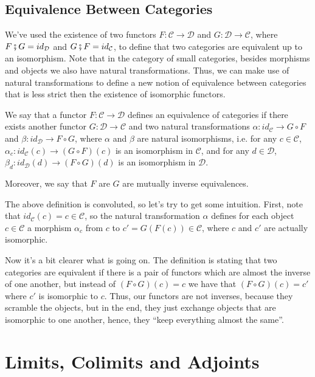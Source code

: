 \subsection{Equivalence Between Categories}

We've used the existence of two functors $F:\mathcal C \to \mathcal D$ and $G:\mathcal D \to \mathcal C$,
where $F \fatsemi G = id_\mathcal D$ and $G \fatsemi F = id_\mathcal C$,
to define that two categories are equivalent up to an isomorphism.
Note that in the category of small categories, besides morphisms and objects we also
have natural transformations. Thus, we can make use of natural transformations to
define a new notion of equivalence between categories that is less strict then 
the existence of isomorphic functors.

\begin{definition}
  We say that a functor $F:\mathcal C \to \mathcal D$ defines an equivalence of
  categories if there exists another functor $G:\mathcal D \to \mathcal C$ and
  two natural transformations
  $\alpha: id_\mathcal C \to G \circ F$ and
  $\beta: id_\mathcal D \to F \circ G$, where $\alpha$ and $\beta$ are natural isomorphisms,
  i.e. for any $c \in \mathcal C$,
  $\alpha_c:id_\mathcal C(c) \to (G \circ F)(c)$ is an
  isomorphism in $\mathcal C$, and for any $d \in \mathcal D$, 
  $\beta_d:id_\mathcal D(d) \to (F \circ G)(d)$ is an isomorphism in $\mathcal D$.

  Moreover, we say that $F$ are $G$ are mutually inverse equivalences.
\end{definition}

The above definition is convoluted, so let's try to get some intuition.
First, note that $id_\mathcal C(c) = c \in \mathcal C$, so the natural transformation
$\alpha$ defines for each object $c \in \mathcal C$ a morphism $\alpha_c$ from $c$
to $c' = G(F(c)) \in \mathcal C$, where $c$ and $c'$ are actually isomorphic.

Now it's a bit clearer what is going on. The definition is stating that two
categories are equivalent if there is a pair of functors which are almost the inverse
of one another, but instead of $(F \circ G)(c) = c$ we have that
$(F \circ G )(c) = c'$  where $c'$ is isomorphic to $c$.
Thus, our functors are not inverses, because they scramble the objects, but in the end,
they just exchange objects that are isomorphic to one another, hence, they ``keep everything
almost the same''.


\section{Limits, Colimits and Adjoints}

